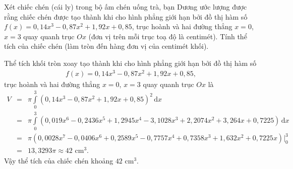 \begin{ex}%
Xét chiếc chén (cái ly) trong bộ ấm chén uống trà, bạn Dương ước lượng được rằng chiếc chén được tạo thành khi cho hình phẳng giới hạn bởi đồ thị hàm số
$f(x)=0{,}14x^3-0{,}87x^2+1{,}92x+0{,}85$, trục hoành và hai đường thẳng $x=0$, $x=3$ quay quanh trục $Ox$ (đơn vị trên mỗi trục toạ độ là centimét). Tính thể tích của chiếc chén  (làm tròn đến hàng đơn vị của centimét khối).
\begin{center}
\end{center}
\loigiai
{
Thể tích khối tròn xoay tạo thành khi cho hình phẳng giới hạn bởi đồ thị hàm số
\begin{align*}
f(x)=0{,}14x^3-0{,}87x^2+1{,}92x+0{,}85,
\end{align*}
trục hoành và hai đường thẳng $x=0$, $x=3$ quay quanh trục $Ox$ là
\begin{eqnarray*}
V&=&\pi \displaystyle\int\limits_{0}^{3} \left(0{,}14x^3-0{,}87x^2+1{,}92x+0{,}85\right)^2 \mathrm{\,d}x\\
&=&\pi \displaystyle\int\limits_{0}^{3} \left(0{,}019x^6-0{,}2436x^5+1{,}2945x^4-3{,}1028x^3+2{,}2074x^2+3{,}264x+0{,}7225\right) \mathrm{\,d}x\\
&=&\pi \left(0{,}0028x^7-0{,}0406x^6+0{,}2589x^5-0{,}7757x^4+0{,}7358x^3+1{,}632x^2+0{,}7225x\right)\bigg|_{0}^3\\
&=&13{,}3293\pi\approx 42 \text{ cm}^3.
\end{eqnarray*}
Vậy thể tích của chiếc chén khoảng $42$ cm$^3$.
}
\end{ex}

